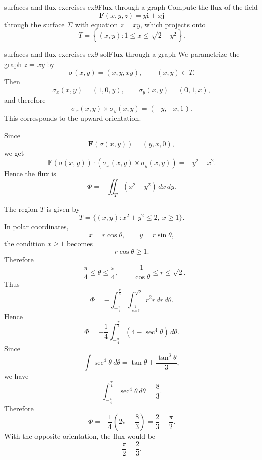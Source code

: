 \documentclass[preview]{standalone}
\begin{document}
\begin{snippetexercise}{surfaces-and-flux-exercises-ex9}{Flux through a graph}
    Compute the flux of the field \[\mathbf{F}(x,y,z)=y\mathbf{i}+x\mathbf{j}\] through the surface \(\Sigma\) with equation \(z=xy\), which projects onto \[T=\left\{(x,y):1\leq x\leq\sqrt{2-y^2}\right\}.\]
\end{snippetexercise}

\begin{snippetsolution}{surfaces-and-flux-exercises-ex9-sol}{Flux through a graph}
    We parametrize the graph \(z=xy\) by
    \[
        \sigma(x,y)=(x,y,xy),
        \qquad (x,y)\in T.
    \]
    Then
    \[
        \sigma_x(x,y)=(1,0,y),
        \qquad
        \sigma_y(x,y)=(0,1,x),
    \]
    and therefore
    \[
        \sigma_x(x,y)\times\sigma_y(x,y)=(-y,-x,1).
    \]
    This corresponds to the upward orientation.

    Since
    \[
        \mathbf{F}(\sigma(x,y))=(y,x,0),
    \]
    we get
    \[
        \mathbf{F}(\sigma(x,y))\cdot
        \left(\sigma_x(x,y)\times\sigma_y(x,y)\right)
        =
        -y^2-x^2.
    \]
    Hence the flux is
    \[
        \Phi
        =
        -\iint_T (x^2+y^2)\,dx\,dy.
    \]

    The region \(T\) is given by
    \[
        T=\{(x,y):x^2+y^2\leq 2,\ x\geq 1\}.
    \]
    In polar coordinates,
    \[
        x=r\cos\theta,\qquad y=r\sin\theta,
    \]
    the condition \(x\geq 1\) becomes
    \[
        r\cos\theta\geq 1.
    \]
    Therefore
    \[
        -\frac{\pi}{4}\leq \theta\leq \frac{\pi}{4},
        \qquad
        \frac{1}{\cos\theta}\leq r\leq \sqrt{2}.
    \]
    Thus
    \[
        \Phi
        =
        -\int_{-\frac{\pi}{4}}^{\frac{\pi}{4}}
        \int_{\frac{1}{\cos\theta}}^{\sqrt{2}}
        r^2 r\,dr\,d\theta.
    \]
    Hence
    \[
        \Phi
        =
        -\frac{1}{4}
        \int_{-\frac{\pi}{4}}^{\frac{\pi}{4}}
        \left(4-\sec^4\theta\right)
        \,d\theta.
    \]
    Since
    \[
        \int \sec^4\theta\,d\theta
        =
        \tan\theta+\frac{\tan^3\theta}{3},
    \]
    we have
    \[
        \int_{-\frac{\pi}{4}}^{\frac{\pi}{4}}\sec^4\theta\,d\theta
        =
        \frac{8}{3}.
    \]
    Therefore
    \[
        \Phi
        =
        -\frac{1}{4}
        \left(2\pi-\frac{8}{3}\right)
        =
        \frac{2}{3}-\frac{\pi}{2}.
    \]
    With the opposite orientation, the flux would be
    \[
        \frac{\pi}{2}-\frac{2}{3}.
    \]
\end{snippetsolution}
\end{document}
